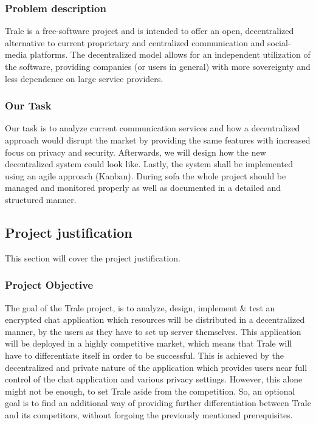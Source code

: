 \subsubsection{Problem description}

Trale is a free-software project and is intended to offer an open, decentralized alternative to current
proprietary and centralized communication and social-media platforms.
The decentralized model allows for an independent utilization of the software, providing companies (or users in general)
with more sovereignty and less dependence on large service providers.

\subsubsection{Our Task}

Our task is to analyze current communication services and how a decentralized approach would disrupt the market by
providing the same features with increased focus on privacy and security.
Afterwards, we will design how the new decentralized system could look like.
Lastly, the system shall be implemented using an agile approach (Kanban).
During \ac{sofa} the whole project should be managed and monitored properly as well as documented in a detailed and
structured manner.

\subsection{Project justification}\label{subsec:project-justification}

This section will cover the project justification.

\subsubsection{Project Objective}

The goal of the Trale project, is to analyze, design, implement \& test an encrypted chat application which
resources will be distributed in a decentralized manner, by the users as they have to set up server themselves.
This application will be deployed in a highly competitive market, which means that Trale will have to
differentiate itself in order to be successful.
This is achieved by the decentralized and private nature of the application which provides users near full control of
the chat application and various privacy settings.
However, this alone might not be enough, to set Trale aside from the competition.
So, an optional goal is to find an additional way of providing further differentiation between Trale and its
competitors, without forgoing the previously mentioned prerequisites.

